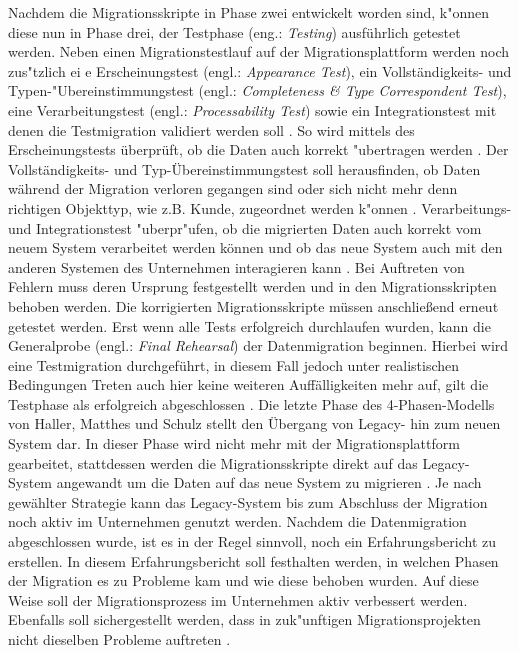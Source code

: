 Nachdem die Migrationsskripte in Phase zwei entwickelt worden sind, k"onnen diese nun in Phase drei, der Testphase (eng.: \textit{Testing}) ausführlich getestet werden. Neben einen Migrationstestlauf auf der Migrationsplattform werden noch zus"tzlich ei e Erscheinungstest (engl.: \textit{Appearance Test}), ein Vollständigkeits- und Typen-"Ubereinstimmungstest (engl.: \textit{Completeness \& Type Correspondent Test}), eine Verarbeitungstest (engl.: \textit{Processability Test}) sowie ein Integrationstest mit denen die Testmigration validiert werden soll \citep[S.~8f.]{klausMatthesSchulz-2012}. So wird mittels des Erscheinungstests überprüft, ob die Daten auch korrekt "ubertragen werden \citep[S.~8f.]{klausMatthesSchulz-2012}. Der Vollständigkeits- und Typ-Übereinstimmungstest soll herausfinden, ob Daten während der Migration verloren gegangen sind oder sich nicht mehr denn richtigen Objekttyp, wie z.B. Kunde, zugeordnet werden k"onnen \citep[S.~9]{klausMatthesSchulz-2012}. Verarbeitungs- und Integrationstest "uberpr"ufen, ob die migrierten Daten auch korrekt vom neuem System verarbeitet werden können und ob das neue System auch mit den anderen Systemen des Unternehmen interagieren kann \citep[S.~9]{klausMatthesSchulz-2012}. Bei Auftreten von Fehlern muss deren Ursprung festgestellt werden und in den Migrationsskripten behoben werden. Die korrigierten Migrationsskripte müssen anschließend erneut getestet werden. Erst wenn alle Tests erfolgreich durchlaufen wurden, kann die Generalprobe (engl.: \textit{Final Rehearsal}) der Datenmigration beginnen. Hierbei wird eine Testmigration durchgeführt, in diesem Fall jedoch unter realistischen Bedingungen Treten auch hier keine weiteren Auffälligkeiten mehr auf, gilt die Testphase als erfolgreich abgeschlossen \citep[S.~9f.]{klausMatthesSchulz-2012}.
\lb
Die letzte Phase des 4-Phasen-Modells von Haller, Matthes und Schulz stellt den Übergang von Legacy- hin zum neuen System dar. In dieser Phase wird nicht mehr mit der Migrationsplattform gearbeitet, stattdessen werden die Migrationsskripte direkt auf das Legacy-System angewandt um die Daten auf das neue System zu migrieren \citep[S.~10]{klausMatthesSchulz-2012}. Je nach gewählter Strategie kann das Legacy-System bis zum Abschluss der Migration noch aktiv im Unternehmen genutzt werden. 
Nachdem die Datenmigration abgeschlossen wurde, ist es in der Regel sinnvoll, noch ein Erfahrungsbericht zu erstellen. In diesem Erfahrungsbericht soll festhalten werden, in welchen Phasen der Migration es zu Probleme kam und wie diese behoben wurden. Auf diese Weise soll der Migrationsprozess im Unternehmen aktiv verbessert werden. Ebenfalls soll sichergestellt werden, dass in zuk"unftigen Migrationsprojekten nicht dieselben Probleme auftreten \citep[S.~10]{klausMatthesSchulz-2012}.

